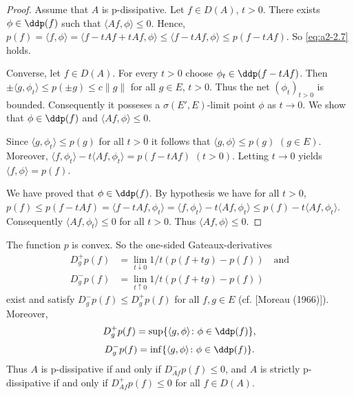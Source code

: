 \begin{proof}
Assume that $A$ is p-dissipative.
Let $f \in D(A)$, $t > 0$.
There exists $\phi \in\ddp(f)$ such that $\langle Af,\phi \rangle \leq 0$.
Hence, $p(f) = \langle f,\phi \rangle = \langle f - tAf + tAf, \phi \rangle \leq \langle f - tAf,\phi \rangle \leq p(f - tAf)$.
So \eqref{eq:a2-2.7} holds.

Converse, let $f \in D(A)$.
For every $t > 0$ choose $\phi_{t} \in \ddp(f - tAf)$.
Then $\pm\langle g,\phi_{t} \rangle \leq p(\pm g) \leq c\|g\|$ for all $g \in E$, $t > 0$.
Thus the net $(\phi_{t})_{t>0}$ is bounded.
Consequently it posseses a $\sigma(E',E)$-limit point $\phi$ as $t \to 0$.
We show that $\phi \in \ddp(f)$ and $\langle Af,\phi \rangle \leq 0$.

Since $\langle g,\phi_{t} \rangle \leq p(g)$ for all $t > 0$ it follows that $\langle g,\phi \rangle \leq p(g)$ $(g \in E)$.
Moreover, $\langle f,\phi_{t} \rangle - t\langle Af, \phi_{t} \rangle = p(f - tAf)$ $(t > 0)$.
Letting $t \to 0$ yields $\langle f,\phi \rangle = p(f)$.

We have proved that $\phi \in \ddp(f)$.
By hypothesis we have for all $t > 0$, 
$p(f) \leq p(f-tAf) 
= \langle f-tAf,\phi_{t} \rangle 
= \langle f,\phi_{t} \rangle - t\langle Af,\phi_{t} \rangle \leq p(f) - t\langle Af,\phi_{t} \rangle$.
Consequently $\langle Af,\phi_{t} \rangle \leq 0$ for all $t > 0$.
Thus $\langle Af,\phi \rangle \leq 0$.
\end{proof}
\begin{remark}\label{rem:a2-2.4}
The function $p$ is convex.
So the one-sided Gateaux-derivatives
\begin{align*}
D^{+}_{g} p(f) &= \lim_{t \downarrow 0} 1/t (p(f+tg) - p(f)) \quad \text{and} \\
D^{-}_{g} p(f) &= \lim_{t \uparrow 0} 1/t (p(f+tg) - p(f))
\end{align*}
exist and satisfy $D^{-}_{g}p(f) \leq D^{+}_{g}p(f)$ for all $f, g \in E$ (cf. [Moreau (1966)]).
Moreover,
\begin{equation}\label{eq:a2-2.9}
D^{+}_{g} p(f) = \sup \{\langle g,\phi \rangle \colon \phi \in \ddp(f)\},
\end{equation}
\begin{equation}\label{eq:a2-2.10}
D^{-}_{g} p(f) = \inf \{\langle g,\phi \rangle \colon \phi \in \ddp(f)\}.
\end{equation}
Thus $A$ is p-dissipative if and only if $D^{-}_{Af} p(f) \leq 0$, and $A$ is strictly p-dissipative if and only if $D^{+}_{Af} p(f) \leq 0$ for all $f \in D(A)$.
\end{remark}
